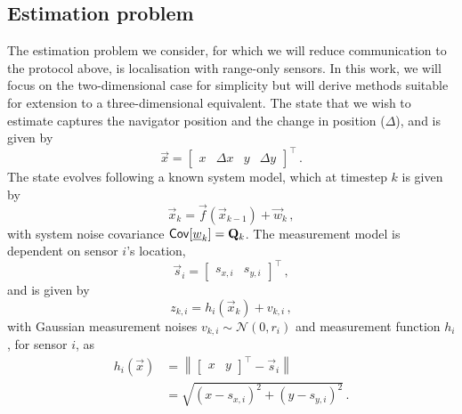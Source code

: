 \documentclass[10pt,letterpaper,oneside,twocolumn,journal]{IEEEtran}
\theoremstyle{definition}
\theoremstyle{definition}
\theoremstyle{remark}
\begin{document}
\subsection{Estimation problem} \label{subsec:est_problem}
The estimation problem we consider, for which we will reduce communication to the protocol above, is localisation with range-only sensors. In this work, we will focus on the two-dimensional case for simplicity but will derive methods suitable for extension to a three-dimensional equivalent. The state that we wish to estimate captures the navigator position and the change in position ($\Delta$), and is given by
\begin{equation}
    \vec{x} = 
    \begin{bmatrix}
        x & \Delta x & y & \Delta y
    \end{bmatrix}^\top\,. \label{eqn:state_definition}
\end{equation}
The state evolves following a known system model, which at timestep $k$ is given by
\begin{equation}
    \vec{x}_k = \vec{f}(\vec{x}_{k-1})+\vec{w}_k\,, \label{eqn:system_model}
\end{equation}
with system noise covariance $\mathsf{Cov}[{\underline{w}}_k]={{\mathbf{Q}}}_k$. The measurement model is dependent on sensor $i$'s location,
\begin{equation}
    \vec{s}_i = 
    \begin{bmatrix}
        s_{x,i} & s_{y,i}
    \end{bmatrix}^\top\,,
\end{equation} 
and is given by
\begin{equation}
    z_{k,i} = h_i(\vec{x}_k)+v_{k,i}\,, \label{eqn:measurement_model}
\end{equation}
with Gaussian measurement noises $v_{k,i} \sim \mathcal{N}(0,r_i)$ and measurement function $h_i$, for sensor $i$, as
\begin{equation}
    \begin{split}
        h_i(\vec{x}) &= \left\lVert
        \begin{bmatrix}
            x & y
        \end{bmatrix}^\top
        - \vec{s}_{i}\right\rVert \\
        &= \sqrt{(x-s_{x,i})^2 + (y-s_{y,i})^2}\,.
    \end{split}
\end{equation}
\end{document}
